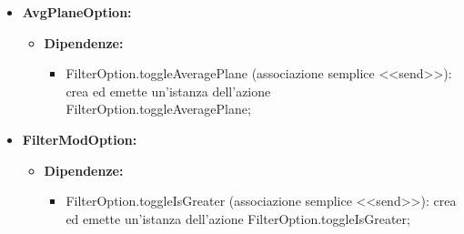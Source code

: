 \begin{itemize}
    \item \textbf{AvgPlaneOption:}
    \begin{itemize}
        \item \textbf{Dipendenze:}
        \begin{itemize}
            \item FilterOption.toggleAveragePlane (associazione semplice <<send>>): crea ed emette un’istanza dell’azione FilterOption.toggleAveragePlane;
        \end{itemize} 
    \end{itemize}

    \item \textbf{FilterModOption:}
    \begin{itemize}
        \item \textbf{Dipendenze:}
        \begin{itemize}
            \item FilterOption.toggleIsGreater (associazione semplice <<send>>): crea ed emette un’istanza dell’azione FilterOption.toggleIsGreater;
        \end{itemize} 
    \end{itemize}
\end{itemize}

